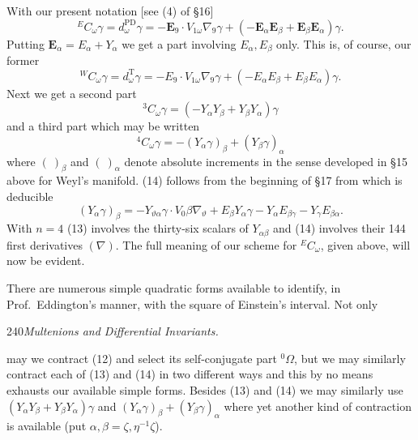 \documentclass[11pt]{article}
\begin{document}
\indent With our present notation [see (4) of \S16]
\begin{equation}{}^E C_\omega\gamma=d_\omega^{\mathrm{PD}}\gamma=-\mathbf{E}_9\mathbin{\cdot}V_{1\omega}\nabla_9\gamma+(-\mathbf{E}_\alpha\mathbf{E}_\beta+\mathbf{E}_\beta\mathbf{E}_\alpha)\gamma.\tag{11}\end{equation}
\indent Putting $\mathbf{E}_\alpha=E_\alpha+Y_\alpha$ we get a part involving $E_\alpha,E_\beta$ only. This is, of course, our former
\begin{equation}{}^W C_\omega\gamma=d_\omega^{\mathrm T}\gamma=-E_9\mathbin{\cdot}V_{1\omega}\nabla_9\gamma+(-E_\alpha E_\beta+E_\beta E_\alpha)\gamma.\tag{12}\end{equation}
\indent Next we get a second part
\begin{equation}{}^3C_\omega\gamma=(-Y_\alpha Y_\beta+Y_\beta Y_\alpha)\gamma\tag{13}\end{equation}
and a third part which may be written
\begin{equation}{}^4C_\omega\gamma=-(Y_\alpha\gamma)_\beta+(Y_\beta\gamma)_\alpha\tag{14}\end{equation}
where $(\ )_\beta$ and $(\ )_\alpha$ denote absolute increments in the sense developed in \S15 above for Weyl's manifold. (14) follows from the beginning of \S17 from which is deducible
\[
(Y_\alpha\gamma)_\beta=-Y_{\vartheta\alpha}\gamma\mathbin{\cdot}V_0\beta\nabla_\vartheta+E_\beta Y_\alpha\gamma-Y_\alpha E_{\beta\gamma}-Y_\gamma E_{\beta\alpha}.
\]
\indent With $n=4$ (13) involves the thirty-six scalars of $Y_{\alpha\beta}$ and (14) involves their 144 first derivatives $(\nabla)$. The full meaning of our scheme for ${}^E C_\omega$, given above, will now be evident.

\indent There are numerous simple quadratic forms available to identify, in Prof.\ Eddington's manner, with the square of Einstein's interval. Not only
\newpage\thispagestyle{empty}\begin{center}240\hfill\textit{Multenions and Differential Invariants.}\end{center}
may we contract (12) and select its self-conjugate part ${}^0\Omega$, but we may similarly contract each of (13) and (14) in two different ways and this by no means exhausts our available simple forms. Besides (13) and (14) we may similarly use $(Y_\alpha Y_\beta+Y_\beta Y_\alpha)\gamma$ and $(Y_\alpha\gamma)_\beta+(Y_\beta\gamma)_\alpha$ where yet another kind of contraction is available (put $\alpha,\beta=\zeta,\eta^{-1}\zeta$).
\end{document}

